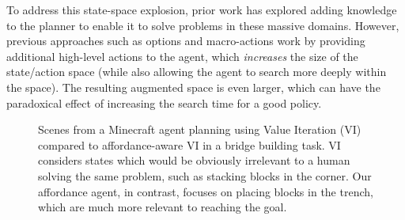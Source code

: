 \documentclass[]{article}
\begin{document}
To address this state-space explosion, prior work has explored adding
knowledge to the planner to enable it to solve problems in these
massive domains. However, previous approaches such as options and
macro-actions work by providing additional high-level actions to the
agent, which {\em increases} the size of the state/action space (while
also allowing the agent to search more deeply within the space).  The
resulting augmented space is even larger, which can have the
paradoxical effect of increasing the search time for a good policy.

\begin{figure}
\centering
%
%
  \caption{Scenes from a Minecraft agent planning using Value
    Iteration (VI) compared to affordance-aware VI in a bridge
    building task.  VI considers states which would be obviously
    irrelevant to a human solving the same problem, such as stacking
    blocks in the corner.  Our affordance agent, in contrast, focuses
    on placing blocks in the trench, which are much more relevant to
    reaching the goal.\label{fig:minecraft}}
\end{figure}
\end{document}
